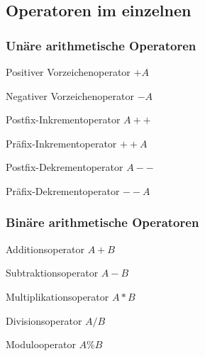 			\subsection{Operatoren im einzelnen }
				\begin{minipage}[t]{9 cm}
					\subsubsection{Unäre arithmetische Operatoren}
						\begin{compactitem}
							\item Positiver Vorzeichenoperator $+A$
							\item Negativer Vorzeichenoperator $-A$
							\item Postfix-Inkrementoperator $A++$
							\item Präfix-Inkrementoperator $++A$
							\item Postfix-Dekrementoperator $A- -$
							\item Präfix-Dekrementoperator $- -A$
						\end{compactitem}
				\end{minipage}
				\hspace*{0.5cm}
				\begin{minipage}[t]{9 cm}
					\subsubsection{Binäre arithmetische Operatoren}
						\begin{compactitem}
							\item Additionsoperator $A + B$
							\item Subtraktionsoperator $A - B$
							\item Multiplikationsoperator $A * B$
							\item Divisionsoperator $A / B$
							\item Modulooperator $A \% B$   
						\end{compactitem}	
				\end{minipage}\\\\
